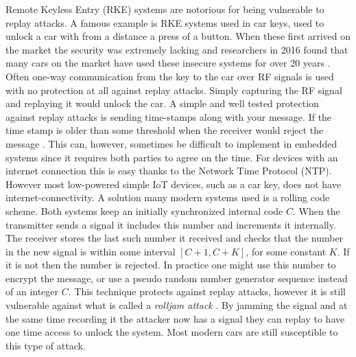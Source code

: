 Remote Keyless Entry (RKE) systems are notorious for being vulnerable to replay attacks. A famous example is RKE systems used in car keys, used to unlock a car with from a distance a press of a button. When these first arrived on the market the security was extremely lacking and researchers in 2016 found that many cars on the market have used these insecure systems for over 20 years \cite{car-rke-systems}. Often one-way communication from the key to the car over RF signals is used with no protection at all against replay attacks. Simply capturing the RF signal and replaying it would unlock the car. A simple and well tested protection against replay attacks is sending time-stamps along with your message. If the time stamp is older than some threshold when the receiver would reject the message \cite{rke-replay}. This can, however, sometimes be difficult to implement in embedded systems since it requires both parties to agree on the time. For devices with an internet connection this is easy thanks to the Network Time Protocol (NTP). However most low-powered simple IoT devices, such as a car key, does not have internet-connectivity. A solution many modern systems used is a rolling code scheme. Both systems keep an initially synchronized internal code $C$. When the transmitter sends a signal it includes this number and increments it internally. The receiver stores the last such number it received and checks that the number in the new signal is within some interval $[C+1, C+K]$, for some constant $K$. If it is not then the number is rejected. In practice one might use this number to encrypt the message, or use a pseudo random number generator sequence instead of an integer $C$. This technique protects against replay attacks, however it is still vulnerable against what is called a \textit{rolljam attack} \cite{kamkar2015drive}. By jamming the signal and at the same time recording it the attacker now has a signal they can replay to have one time access to unlock the system. Most modern cars are still susceptible to this type of attack.

